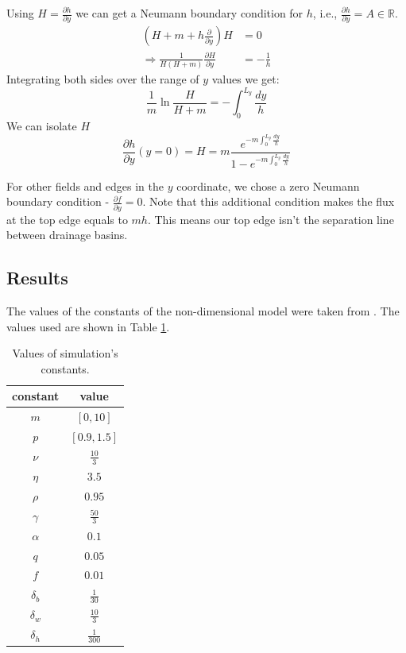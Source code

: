 \documentclass{article}
\numberwithin{equation}{section}
\begin{document}
Using $H=\frac{\partial h}{\partial y}$ we can get a Neumann boundary condition for $h$, i.e., $\frac{\partial h}{\partial y}=A\in \mathbb{R}$.
\begin{align}
    \left(H + m + h\frac{\partial}{\partial y}\right)H         & = 0             \\
    \Rightarrow \frac{1}{H(H+m)} \frac{\partial H}{\partial y} & = - \frac{1}{h}
\end{align}
Integrating both sides over the range of $y$ values we get:
\begin{equation}
    \frac{1}{m}\ln{\frac{H}{H+m}} = -\int_0^{L_y} \frac{dy}{h}
\end{equation}
We can isolate $H$
\begin{equation}
    \frac{\partial h}{\partial y} (y=0) = H = m \frac{e^{-m \int_0^{L_y} \frac{dy}{h}}}{1 - e^{-m \int_0^{L_y} \frac{dy}{h}}}
\end{equation}

For other fields and edges in the $y$ coordinate, we chose a zero Neumann boundary condition - $\frac{\partial f}{\partial y}=0$.
Note that this additional condition makes the flux at the top edge equals to $mh$. This means our top edge isn't the separation line between drainage basins.

\subsection{Results}
The values of the constants of the non-dimensional model were taken from \parencite[]{gilad_mathematical_2007}.
The values used are shown in Table  \ref{table:constants_tables}.
\begin{table}[!ht]
    \centering
    \begin{tabular}{||cc||}
        \hline
        constant   & value           \\
        \hline\hline
        $m$        & $[0, 10]$       \\
        $p$        & $[0.9, 1.5]$    \\
        $\nu$      & $\frac{10}{3}$  \\
        $\eta$     & $3.5$           \\
        $\rho$     & $0.95$          \\
        $\gamma$   & $\frac{50}{3}$  \\
        $\alpha$   & $0.1$           \\
        $q$        & $0.05$          \\
        $f$        & $0.01$          \\
        $\delta_b$ & $\frac{1}{30}$  \\
        $\delta_w$ & $\frac{10}{3}$  \\
        $\delta_h$ & $\frac{1}{300}$ \\
        \hline
    \end{tabular}
    \caption{Values of simulation's constants.}
    \label{table:constants_tables}
\end{table}
\end{document}
